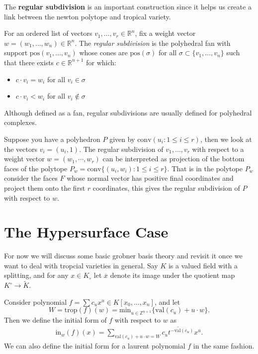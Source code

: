     The \textbf{regular subdivision} is an important construction since it helps us create a link between the newton polytope and tropical variety. 
    \begin{definition}
    For an ordered list of vectors $v_1,\dots, v_r \in \mathbb{R}^{n}$, fix a weight vector $w = (w_1,\dots,w_n) \in \mathbb{R}^{n}$. 
    The \textit{regular subdivision} is the polyhedral fan with support $\text{pos}(v_1,\dots,v_n)$ whose cones are $\text{pos}(\sigma)$ for all $\sigma \subset \{v_1,\dots,v_n\}$ such that there exists $c \in \mathbb{R}^{n+1}$ for which:
    \begin{itemize}
        \item $c \cdot v_i = w_i$ for all $v_{i}\in \sigma$ 
        \item $c \cdot v_i < w_i$ for all $v_i \not\in \sigma$
    \end{itemize}
    Although defined as a fan, regular subdivisions are usually defined for polyhedral complexes.
    \end{definition}
    Suppose you have a polyhedron $P$ given by $\text{conv}(u_i: 1\leq i\leq r)$, then we look at the vectors $v_i = (u_i,1)$. The regular subdivision of $v_1,\dots,v_r$ with respect to a weight vector $w = (w_1, \cdots, w_r)$ can be interpreted as projection of the bottom faces of the polytope $P_w = \text{conv}\{(u_i,w_i): 1\leq i\leq r\}$. That is in the polytope $P_w$ consider the faces $F$ whose normal vector has positive final coordinates and project them onto the first $r$ coordinates, this gives the regular subdivision of $P$ with respect to $w$.

    \section{The Hypersurface Case}
    For now we will discuss some basic grobner basis theory and revisit it once we want to deal with tropcial varieties in general.
    Say $K$ is a valued field with a splitting, and for any $x \in K_{\circ}$ let $\overline{x}$ denote its image under the quotient map $K^{\circ} \to \tilde{K}$.
    \begin{definition}
        Consider polynomial $f = \sum c_u x^u \in K[x_0,\dots,x_n]$, and let
        \[
            W = \text{trop}(f)(w) = \text{min}_{u \in \mathbb{Z}^{n+1}}\{\text{val}(c_u) + u\cdot w\}.
        \]
        Then we define the initial form of $f$ with respect to $w$ as
        \begin{align*}
            \text{in}_{w}(f)(x) = \sum_{\text{val}(c_u) + u\cdot w = W} \overline{c_u t^{-\text{val}(c_u)}} x^u.
        \end{align*}
        We can also define the initial form for a laurent polynomial $f$ in the same fashion.
    \end{definition}
